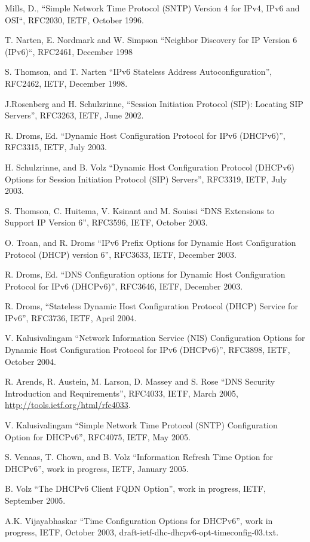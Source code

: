 \newpage
\begin{thebibliography}{1}

 Mills, D., ``Simple Network Time Protocol (SNTP) Version 4 for
        IPv4, IPv6 and OSI``, RFC2030, IETF, October 1996.

 T. Narten, E. Nordmark and W. Simpson ``Neighbor
	Discovery for IP Version 6 (IPv6)``, RFC2461, December 1998

 S. Thomson, and T. Narten ``IPv6 Stateless Address
  Autoconfiguration'', RFC2462, IETF, December 1998.

 J.Rosenberg and H. Schulzrinne, ``Session Initiation Protocol
       (SIP): Locating SIP Servers'', RFC3263, IETF, June 2002.

 R. Droms, Ed. ``Dynamic Host Configuration Protocol
  for IPv6 (DHCPv6)'', RFC3315, IETF, July 2003.

 H. Schulzrinne, and B. Volz ``Dynamic Host
  Configuration Protocol (DHCPv6) Options for Session Initiation
  Protocol (SIP) Servers'', RFC3319, IETF, July 2003.

 S. Thomson, C. Huitema, V. Ksinant and M. Souissi
  ``DNS Extensions to Support IP Version 6'', RFC3596, IETF, October
  2003.

 O. Troan, and R. Droms ``IPv6 Prefix Options for
  Dynamic Host Configuration Protocol (DHCP) version 6'', RFC3633,
  IETF, December 2003.

 R. Droms, Ed. ``DNS Configuration options for
  Dynamic Host Configuration Protocol for IPv6 (DHCPv6)'', RFC3646,
  IETF, December 2003.

 R. Droms, ``Stateless Dynamic Host Configuration
  Protocol (DHCP) Service for IPv6'', RFC3736, IETF, April 2004.

 V. Kalusivalingam ``Network Information Service
  (NIS) Configuration Options for Dynamic Host Configuration Protocol
  for IPv6 (DHCPv6)'', RFC3898, IETF, October 2004.

 R. Arends,  R. Austein, M. Larson, D. Massey and S. Rose
``DNS Security Introduction and Requirements'', RFC4033, IETF, March
	2005, \url{http://tools.ietf.org/html/rfc4033}.

 V. Kalusivalingam ``Simple Network Time Protocol
	(SNTP) Configuration Option for DHCPv6'', RFC4075, IETF, May 2005.

 S. Venaas, T. Chown, and B. Volz
  ``Information Refresh Time Option for DHCPv6'', work in
  progress, IETF, January 2005.

 B. Volz
  ``The DHCPv6 Client FQDN Option'', work in
  progress, IETF, September 2005.

 A.K. Vijayabhaskar ``Time Configuration Options
	for DHCPv6'', work in progress, IETF, October 2003,
	draft-ietf-dhc-dhcpv6-opt-timeconfig-03.txt.

\end{thebibliography}
